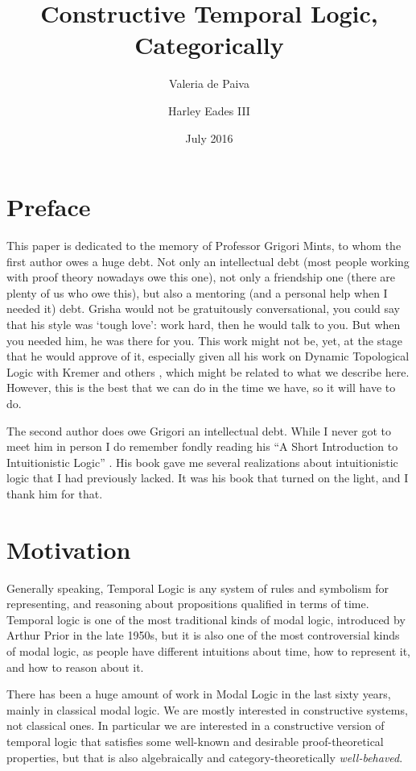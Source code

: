 \documentclass{article}
\title{Constructive Temporal Logic, Categorically}
\author{Valeria de Paiva \and Harley Eades III}
\date{July 2016}
\begin{document}
\maketitle

\section*{Preface}
This paper is dedicated to the memory of Professor Grigori Mints, to
whom the first author owes a huge debt. Not only an intellectual debt
(most people working with proof theory nowadays owe this one), not
only a friendship one (there are plenty of us who owe this), but also
a mentoring (and a personal help when I needed it) debt. Grisha would
not be gratuitously conversational, you could say that his style was
`tough love': work hard, then he would talk to you. But when you
needed him, he was there for you. This work might not be, yet, at the
stage that he would approve of it, especially given all his work on
Dynamic Topological Logic with Kremer and others \cite{kremer2005},
which might be related to what we describe here. However, this is the
best that we can do in the time we have, so it will have to do.

The second author does owe Grigori an intellectual debt.  While I
never got to meet him in person I do remember fondly reading his ``A
Short Introduction to Intuitionistic Logic'' \cite{Mints:2000}.  His
book gave me several realizations about intuitionistic logic that I
had previously lacked.  It was his book that turned on the light, and
I thank him for that.

\section{Motivation}
Generally speaking, Temporal Logic is any system of rules and
symbolism for representing, and reasoning about propositions qualified
in terms of time.  Temporal logic is  one of the most traditional
kinds of modal logic, introduced by Arthur Prior in the late 1950s,
but it is also one of the most controversial kinds of modal logic, as
people have different intuitions about time, how to represent it, and how to reason about it.

There has been a huge amount of work in Modal Logic in the last sixty
years, mainly in classical modal logic. We are mostly interested
in constructive systems, not classical ones. In particular we are interested in a
constructive version of temporal logic that satisfies some well-known
and desirable proof-theoretical properties, but that is also
algebraically and category-theoretically \textit{well-behaved}.
\end{document}
